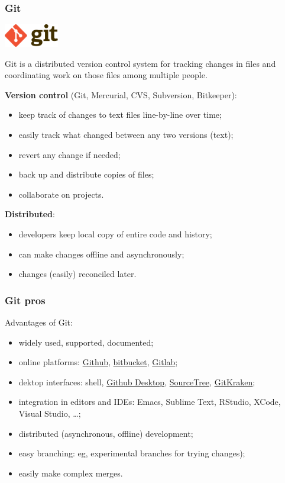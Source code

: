 \documentclass[10pt,svgnames]{beamer}
\begin{document}
\begin{frame}
\frametitle{Git}
\includegraphics[height=1cm]{Git-logo}

Git is a distributed version control system for tracking changes in files and coordinating work on those files among multiple people.
\smallskip
\pause

\textbf{Version control} (Git, Mercurial, CVS, Subversion, Bitkeeper):
\begin{itemize}
   \item keep track of changes to text files line-by-line over time;
   \item easily track what changed between any two versions (text);
   \item revert any change if needed;
   \item back up and distribute copies of files;
   \item collaborate on projects.
 \end{itemize} 
\pause
\textbf{Distributed}:
\begin{itemize}
  \item developers keep local copy of entire code and history;
  \item can make changes offline and asynchronously;
  \item changes (easily) reconciled later.
\end{itemize}
\end{frame}


\begin{frame}
\frametitle{Git pros}

Advantages of Git:
\begin{itemize}
  \item widely used, supported, documented;
  \item online platforms: \href{https://github.com/}{Github}, \href{https://bitbucket.org/}{bitbucket}, \href{https://about.gitlab.com/}{Gitlab};
  \item dektop interfaces: shell, \href{https://desktop.github.com/}{Github Desktop}, \href{https://www.sourcetreeapp.com/}{SourceTree}, \href{https://www.gitkraken.com/}{GitKraken};
  \item integration in editors and IDEs: Emacs, Sublime Text, RStudio, XCode, Visual Studio, \ldots;
  \item distributed (asynchronous, offline) development;
  \item easy branching: eg, experimental branches for trying changes);
  \item easily make complex merges.
\end{itemize}
\end{frame}
\end{document}
